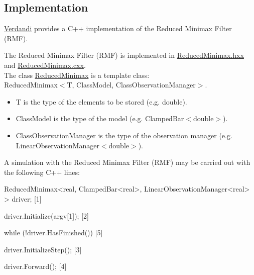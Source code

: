 \documentclass{tufte-book}
\begin{document}
 \hypertarget{reduced_minimax_filter_algorithm_implementation}{}\subsection{\-Implementation}\label{reduced_minimax_filter_algorithm_implementation}


 \hyperlink{namespace_verdandi}{\-Verdandi} provides a \-C++ implementation of the \-Reduced \-Minimax \-Filter (\-R\-M\-F).

\-The \-Reduced \-Minimax \-Filter (\-R\-M\-F) is implemented in {\ttfamily \hyperlink{_reduced_minimax_8hxx_source}{\-Reduced\-Minimax.\-hxx}} and {\ttfamily \hyperlink{_reduced_minimax_8cxx_source}{\-Reduced\-Minimax.\-cxx}}.\\
 \-The class {\ttfamily  \hyperlink{class_verdandi_1_1_reduced_minimax}{\-Reduced\-Minimax}} is a template class\-:\\
  {\ttfamily \-Reduced\-Minimax$<$\-T, \-Class\-Model, \-Class\-Observation\-Manager$>$}.
   \begin{itemize}
  \item {\ttfamily \-T} is the type of the elements to be stored (e.\-g. {\ttfamily double}).
  \item {\ttfamily \-Class\-Model} is the type of the model (e.\-g. {\ttfamily \-Clamped\-Bar$<$double$>$}).
  \item {\ttfamily \-Class\-Observation\-Manager} is the type of the observation manager (e.\-g. {\ttfamily \-Linear\-Observation\-Manager$<$double$>$}).
  \end{itemize}

\-A simulation with the \-Reduced \-Minimax \-Filter (\-R\-M\-F) may be carried out with the following \-C++ lines\-:

 \begin{frame_cpp}
ReducedMinimax<real, ClampedBar<real>,
        LinearObservationManager<real> > driver; [1]

driver.Initialize(argv[1]); [2]

while (!driver.HasFinished()) [5]
{
    driver.InitializeStep(); [3]

    driver.Forward(); [4]
}
\end{frame_cpp}
\end{document}
